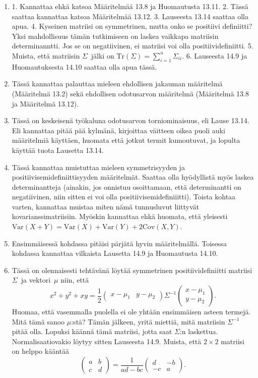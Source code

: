 \documentclass[11pt,a4paper]{amsart}
\newcommand{\1}{\mathbf{1}}
\begin{document}
\begin{Solution}
\begin{enumerate}
\item 1. Kannattaa ehkä katsoa Määritelmää 13.8 ja Huomautusta 13.11. 2. Tässä saattaa kannattaa katsoa Määritelmää 13.12. 3. Lauseesta 13.14 saattaa olla apua. 4. Kyseinen matriisi on symmetrinen, mutta onko se positiivi definiitti? Yksi mahdollisuus tämän tutkimiseen on laskea vaikkapa matriisin determinanntti. Jos se on negatiivinen, ei matriisi voi olla positiividefiniitti. 5. Muista, että matriisin $\Sigma$ jälki on $\mathrm{Tr}(\Sigma)=\sum_{i=1}^n \Sigma_{ii}$. 6. Lauseesta 14.9 ja Huomautuksesta 14.10 saattaa olla apua tässä. 
\item Tässä kannattaa palauttaa mieleen ehdollisen jakauman määritelmä (Määritelmä 13.2) sekä ehdollisen odotusarvon määritelmä (Määritelmä 13.8 ja Määritelmä 13.12).
\item Tässä on keskeisenä työkaluna odotusarvon torniominaisuus, eli Lause 13.14. Eli kannattaa pitää pää kylmänä, kirjoittaa väitteen oikea puoli auki määritelmiä käyttäen, huomata että jotkut termit kumoutuvat, ja lopulta käyttää tuota Lausetta 13.14.
\item Tässä kannattaa muistuttaa mieleen symmetrisyyden ja positiivisemidefiniittisyyden määritelmät. Saattaa olla hyödyllistä myös laskea determinantteja (ainakin, jos onnistuu osoittamaan, että determinantti on negatiivinen, niin sitten ei voi olla positiivisemidefiniiitti). Toista kohtaa varten, kannattaa muistaa miten nämä tunnusluvut liittyvät kovarianssimatriisiin. Myöskin kannattaa ehkä huomata, että yleisesti $\mathrm{Var}(X+Y)=\mathrm{Var}(X)+\mathrm{Var}(Y)+2\mathrm{Cov}(X,Y)$. 
\item Ensimmäisessä kohdassa pitäisi pärjätä hyvin määritelmällä. Toisessa kohdassa kannattaa vilkaista Lausetta 14.9 ja Huomautusta 14.10.
\item Tässä on olennaisesti tehtävänä löytää symmetrinen positiividefiniitti matriisi $\Sigma$ ja vektori $\mu$ niin, että 
\[
x^2+y^2+xy =\frac{1}{2}\begin{pmatrix} x-\mu_1 & y-\mu_2\end{pmatrix} \Sigma^{-1}\begin{pmatrix} x-\mu_1\\
y-\mu_2\end{pmatrix}.
\]
Huomaa, että vasemmalla puolella ei ole yhtään ensimmäisen asteen termejä. Mitä tämä sanoo $\mu$:stä? Tämän jälkeen, yritä miettiä, mitä matriisin $\Sigma^{-1}$ pitää olla. Lopuksi käännä tämä matriisi, jotta saat $\Sigma$:n laskettua. Normalisaatiovakio löytyy sitten Lauseesta 14.9. Muista, että $2\times 2$ matriisi on helppo kääntää
\[
\begin{pmatrix}
a & b\\
c & d
\end{pmatrix}=\frac{1}{ad-bc}\begin{pmatrix}
d & -b\\
-c & a
\end{pmatrix}.
\]
\end{enumerate}
\end{Solution}
\end{document}
